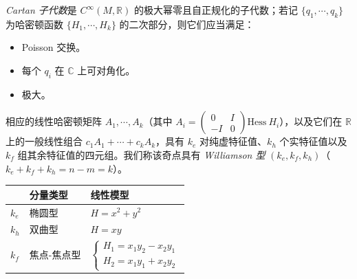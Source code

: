 \emph{Cartan 子代数}是 $C^{\infty} (M,\mathbb{R})$ 的极大幂零且自正规化的子代数；若记 $\{q_1,\dotsb, q_k\}$ 为哈密顿函数 $\{H_1,\dotsb, H_k\}$ 的二次部分，则它们应当满足：

\begin{itemize}[leftmargin=1.4em,itemsep=1pt,topsep=2pt]
  \item Poisson 交换。
  \item 每个 $q_i$ 在 $\mathbb{C}$ 上可对角化。
  \item 极大。
\end{itemize}

相应的线性哈密顿矩阵 $A_1,\dotsb, A_k$（其中 $A_i=\begin{pmatrix}0&I\\-I&0\end{pmatrix}\mathrm{Hess}\ H_i$），以及它们在 $\mathbb{R}$ 上的一般线性组合 $c_1A_1+\dotsb+c_kA_k$，具有 $k_e$ 对纯虚特征值、$k_h$ 个实特征值以及 $k_f$ 组其余特征值的四元组。我们称该奇点具有 \emph{Williamson 型} $(k_e, k_f, k_h)$（$k_e+k_f+k_h=n-m=k$）。


\begin{table}[htbp]
\centering
\small
\begin{tabular}{lll}
\toprule
 & 分量类型 & 线性模型 \\
\midrule
$k_e$ & 椭圆型 & $H=x^2+y^2$ \\
$k_h$ & 双曲型 & $H=xy$ \\
$k_f$ & 焦点-焦点型 & $\left\lbrace\begin{array}{l}H_1=x_1y_2-x_2y_1\\H_2=x_1y_1+x_2y_2\end{array}\right.$ \\
\bottomrule
\end{tabular}
\end{table}



